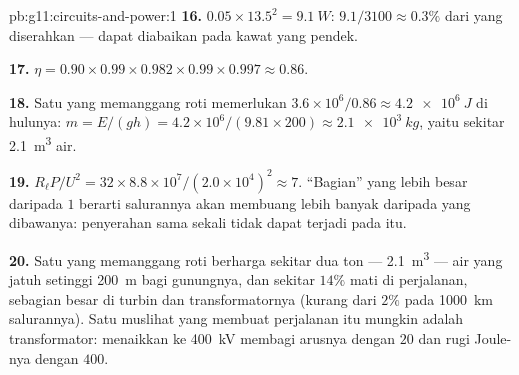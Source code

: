 \begin{solution}{pb:g11:circuits-and-power:1}
\textbf{16.} $0.05 \times 13.5^2 = \qty{9.1}{W}$:
$9.1/3100 \approx
0.3\%$ dari  yang diserahkan --- dapat diabaikan
pada kawat yang pendek.

\textbf{17.} $\eta = 0.90 \times 0.99 \times 0.982 \times 0.99 \times
0.997 \approx 0.86$.

\textbf{18.} Satu  yang memanggang roti memerlukan
$3.6\times10^{6}/0.86
\approx \qty{4.2e6}{J}$ di hulunya:
$m = E/(gh) = 4.2\times10^{6}/(9.81
\times 200) \approx \qty{2.1e3}{kg}$,
yaitu sekitar \qty{2.1}{m^3} air.

\textbf{19.} $R_\ell P/U^2 = 32 \times 8.8\times10^{7}/(2.0\times
10^{4})^2 \approx 7$. ``Bagian'' yang lebih besar daripada $1$ berarti
salurannya akan membuang lebih banyak daripada yang dibawanya:
penyerahan  sama sekali tidak dapat terjadi pada  itu.

\textbf{20.} Satu  yang memanggang roti berharga sekitar dua
ton --- \qty{2.1}{m^3} --- air yang jatuh setinggi \qty{200}{m} bagi
gunungnya, dan sekitar $14\%$  mati di perjalanan, sebagian
besar di turbin dan transformatornya (kurang dari $2\%$ pada
\qty{1000}{km} salurannya). Satu muslihat yang membuat perjalanan itu
mungkin adalah transformator: menaikkan  ke \qty{400}{kV}
membagi arusnya dengan $20$ dan rugi Joule-nya dengan $400$.
\end{solution}
